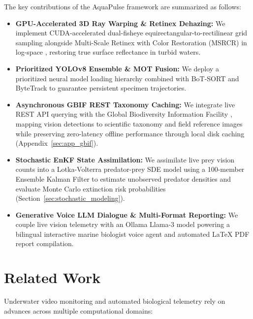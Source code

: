 \documentclass[11pt,a4paper]{article}
\newcommand{\citeblue}[1]{\cite{#1}}
\newcommand{\refblue}[1]{\ref{#1}}
\begin{document}
The key contributions of the AquaPulse framework are summarized as follows:
\begin{itemize}
    \item \textbf{GPU-Accelerated 3D Ray Warping \& Retinex Dehazing:} We implement CUDA-accelerated dual-fisheye equirectangular-to-rectilinear grid sampling alongside Multi-Scale Retinex with Color Restoration (MSRCR) in log-space \citeblue{land1971lightness, jobson1997multiscale, ancuti2012enhancing}, restoring true surface reflectance in turbid waters.
    \item \textbf{Prioritized YOLOv8 Ensemble \& MOT Fusion:} We deploy a prioritized neural model loading hierarchy \citeblue{jocher2023ultralytics} combined with BoT-SORT \citeblue{aharon2022botsort} and ByteTrack \citeblue{zhang2022bytetrack} to guarantee persistent specimen trajectories.
    \item \textbf{Asynchronous GBIF REST Taxonomy Caching:} We integrate live REST API querying with the Global Biodiversity Information Facility \citeblue{gbif2026backbone}, mapping vision detections to scientific taxonomy and field reference images while preserving zero-latency offline performance through local disk caching (Appendix~\refblue{sec:app_gbif}).
    \item \textbf{Stochastic EnKF State Assimilation:} We assimilate live prey vision counts into a Lotka-Volterra predator-prey SDE model using a 100-member Ensemble Kalman Filter \citeblue{sprungk2023, evensen2009data} to estimate unobserved predator densities and evaluate Monte Carlo extinction risk probabilities (Section~\refblue{sec:stochastic_modeling}).
    \item \textbf{Generative Voice LLM Dialogue \& Multi-Format Reporting:} We couple live vision telemetry with an Ollama Llama-3 model \citeblue{touvron2023llama, dubey2024llama3} powering a bilingual interactive marine biologist voice agent and automated LaTeX PDF report compilation.
\end{itemize}

\section{Related Work}
Underwater video monitoring and automated biological telemetry rely on advances across multiple computational domains:
\end{document}
